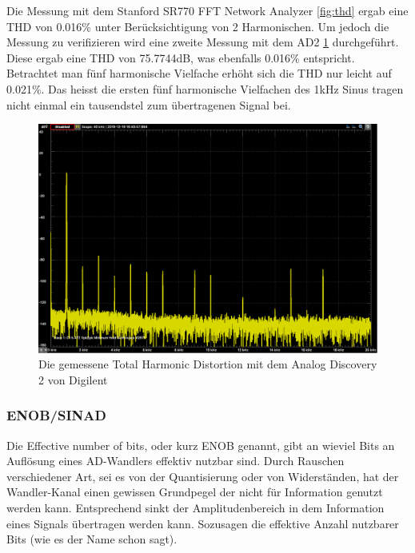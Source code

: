 Die Messung mit dem Stanford SR770 FFT Network Analyzer \ref{fig:thd} ergab eine THD von 0.016\% unter Berücksichtigung von 2 Harmonischen.
Um jedoch die Messung zu verifizieren wird eine zweite Messung mit dem AD2 \ref{fig:thdAD2}  durchgeführt. Diese ergab eine THD von 75.7744dB, was ebenfalls 0.016\% entspricht. Betrachtet man fünf harmonische Vielfache erhöht sich die THD nur leicht auf 0.021\%. Das heisst die ersten fünf harmonische Vielfachen des 1kHz Sinus tragen nicht einmal ein tausendstel zum übertragenen Signal bei.

\begin{figure} [H]
\begin{center}
 \includegraphics[width=\textwidth]{../graphics/THD_LineINOUT.png}
 \caption{Die gemessene Total Harmonic Distortion mit dem Analog Discovery 2 von Digilent}
\label{fig:thdAD2}
\end{center}
\end{figure}

\subsubsection{ENOB/SINAD}
\label{subsubsec:ENOB/SINAD}

Die \glqq Effective number of bits\grqq, oder kurz ENOB genannt, gibt an wieviel Bits an Auflösung eines AD-Wandlers effektiv nutzbar sind. Durch Rauschen verschiedener Art, sei es von der Quantisierung oder von Widerständen, hat der Wandler-Kanal einen gewissen Grundpegel der nicht für Information genutzt werden kann. Entsprechend sinkt der Amplitudenbereich in dem Information eines Signals übertragen werden kann. Sozusagen die effektive Anzahl nutzbarer Bits (wie es der Name schon sagt).

